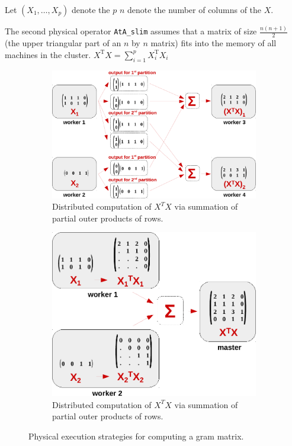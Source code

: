 \documentclass{article}
\begin{document}
Let $(X_1,\dots,X_p)$ denote the $p$  $n$ denote the number of columns of the $X$.

The second physical operator \texttt{AtA\_slim} assumes that a matrix of size $\frac{n(n+1)}{2}$ (the upper triangular part of an $n$ by $n$ matrix) fits into the memory of all machines in the cluster. $X^\mathrm{T}X = \sum_{i = 1}^{p} X_i^\mathrm{T}X_i$ 

\begin{figure}[t]
  \centering
  \begin{subfigure}[b]{0.45\textwidth}
    \centering
    \includegraphics[scale=.35]{figures/ata-nonlocal-crop}
    \caption{Distributed computation of $X^{T}X$ via summation of partial outer products of rows.}
    \label{fig:atanonlocal}
  \end{subfigure}
  \hfill
  \begin{subfigure}[b]{0.45\textwidth}
    \centering
    \includegraphics[scale=.35]{figures/ata-local-crop}
    \caption{Distributed computation of $X^{T}X$ via summation of partial outer products of rows.}
    \label{fig:atalocal}
  \end{subfigure}
  \caption{\label{fig:ataphysical} Physical execution strategies for computing a gram matrix.}
\end{figure}
\end{document}
